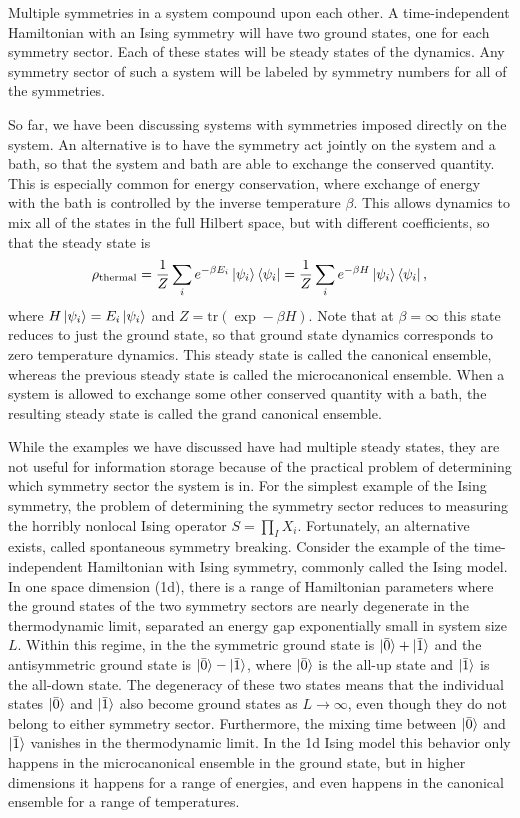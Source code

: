 Multiple symmetries in a system compound upon each other. A time-independent Hamiltonian with an Ising symmetry will have two ground states, one for each symmetry sector. Each of these states will be steady states of the dynamics. Any symmetry sector of such a system will be labeled by symmetry numbers for all of the symmetries.

So far, we have been discussing systems with symmetries imposed directly on the system. An alternative is to have the symmetry act jointly on the system and a bath, so that the system and bath are able to exchange the conserved quantity. This is especially common for energy conservation, where exchange of energy with the bath is controlled by the inverse temperature $\beta$. This allows dynamics to mix all of the states in the full Hilbert space, but with different coefficients, so that the steady state is
\begin{equation}
\rho_\text{thermal} = \frac{1}{Z} \sum_i e^{-\beta E_i} \ket{\psi_i} \bra{\psi_i} = \frac{1}{Z} \sum_i e^{-\beta H} \ket{\psi_i} \bra{\psi_i},
\end{equation}
where $H\ket{\psi_i} = E_i \ket{\psi_i}$ and $Z = \text{tr}(\exp -\beta H)$. Note that at $\beta=\infty$ this state reduces to just the ground state, so that ground state dynamics corresponds to zero temperature dynamics.
This steady state is called the canonical ensemble, whereas the previous steady state is called the microcanonical ensemble. When a system is allowed to exchange some other conserved quantity with a bath, the resulting steady state is called the grand canonical ensemble. 

While the examples we have discussed have had multiple steady states, they are not useful for information storage because of the practical problem of determining which symmetry sector the system is in. For the simplest example of the Ising symmetry, the problem of determining the symmetry sector reduces to measuring the horribly nonlocal Ising operator $S = \prod_I X_i$. Fortunately, an alternative exists, called spontaneous symmetry breaking. Consider the example of the time-independent Hamiltonian with Ising symmetry, commonly called the Ising model. In one space dimension (1d), there is a range of Hamiltonian parameters where the ground states of the two symmetry sectors are nearly degenerate in the thermodynamic limit, separated an energy gap exponentially small in system size $L$. Within this regime, in the  the symmetric ground state is $\ket{\bar{0}}+\ket{\bar{1}}$ and the antisymmetric ground state is $\ket{\bar{0}}-\ket{\bar{1}}$, where $\ket{\bar{0}}$ is the all-up state and $\ket{\bar{1}}$ is the all-down state. The degeneracy of these two states means that the individual states $\ket{\bar{0}}$ and $\ket{\bar{1}}$ also become ground states as $L\to \infty$, even though they do not belong to either symmetry sector. Furthermore, the mixing time between $\ket{\bar{0}}$ and $\ket{\bar{1}}$ vanishes in the thermodynamic limit. In the 1d Ising model this behavior only happens in the microcanonical ensemble in the ground state, but in higher dimensions it happens for a range of energies, and even happens in the canonical ensemble for a range of temperatures. 


